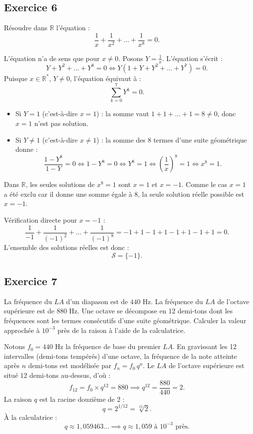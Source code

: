 \documentclass[11pt,a4paper]{article}
\newcommand{\R}{\mathbb{R}}
\begin{document}
\subsection*{Exercice 6}
Résoudre dans $\R$ l'équation :
\[
\frac{1}{x} + \frac{1}{x^2} + \dots + \frac{1}{x^8} = 0.
\]

\begin{correctionbox}
L'équation n'a de sens que pour $x \ne 0$. Posons $Y = \frac{1}{x}$. L'équation s'écrit :
\[
Y + Y^2 + \dots + Y^8 = 0 \iff Y(1 + Y + Y^2 + \dots + Y^7) = 0.
\]
Puisque $x \in \R^*$, $Y \ne 0$, l'équation équivaut à :
\[
\sum_{k=0}^7 Y^k = 0.
\]
\begin{itemize}
    \item Si $Y = 1$ (c'est-à-dire $x = 1$) : la somme vaut $1 + 1 + \dots + 1 = 8 \ne 0$, donc $x=1$ n'est pas solution.
    \item Si $Y \ne 1$ (c'est-à-dire $x \ne 1$) : la somme des 8 termes d'une suite géométrique donne :
    \[
    \frac{1 - Y^8}{1 - Y} = 0 \iff 1 - Y^8 = 0 \iff Y^8 = 1 \iff \left(\frac{1}{x}\right)^8 = 1 \iff x^8 = 1.
    \]
\end{itemize}
Dans $\R$, les seules solutions de $x^8 = 1$ sont $x = 1$ et $x = -1$.
Comme le cas $x=1$ a été exclu car il donne une somme égale à 8, la seule solution réelle possible est $x = -1$.

Vérification directe pour $x = -1$ :
\[
\frac{1}{-1} + \frac{1}{(-1)^2} + \dots + \frac{1}{(-1)^8} = -1 + 1 - 1 + 1 - 1 + 1 - 1 + 1 = 0.
\]
L'ensemble des solutions réelles est donc :
\[
\mathcal{S} = \{-1\}.
\]
\end{correctionbox}

\subsection*{Exercice 7}
La fréquence du $LA$ d'un diapason est de $440\text{~Hz}$. La fréquence du $LA$ de l'octave supérieure est de $880\text{~Hz}$. Une octave se décompose en 12 demi-tons dont les fréquences sont les termes consécutifs d'une suite géométrique. Calculer la valeur approchée à $10^{-3}$ près de la raison à l'aide de la calculatrice.

\begin{correctionbox}
Notons $f_0 = 440\text{~Hz}$ la fréquence de base du premier $LA$.
En gravissant les 12 intervalles (demi-tons tempérés) d'une octave, la fréquence de la note atteinte après $n$ demi-tons est modélisée par $f_n = f_0 \, q^n$.
Le $LA$ de l'octave supérieure est situé 12 demi-tons au-dessus, d'où :
\[
f_{12} = f_0 \times q^{12} = 880 \implies q^{12} = \frac{880}{440} = 2.
\]
La raison $q$ est la racine douzième de 2 :
\[
q = 2^{1/12} = \sqrt[12]{2}.
\]
À la calculatrice :
\[
q \approx 1{,}059463\dots \implies q \approx 1{,}059 \text{ à } 10^{-3} \text{ près}.
\]
\end{correctionbox}
\end{document}
